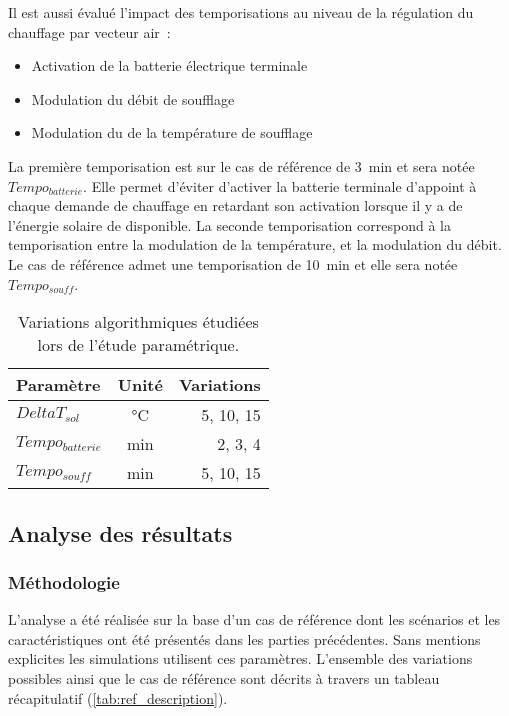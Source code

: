 Il est aussi évalué l’impact des temporisations au niveau de la régulation du chauffage
par vecteur air~:
\begin{itemize}
  \item Activation de la batterie électrique terminale
  \item Modulation du débit de soufflage
  \item Modulation du de la température de soufflage
\end{itemize}

La première temporisation est sur le cas de référence de \SI{3}{min} et sera notée
$Tempo_{batterie}$. Elle permet d’éviter d’activer la batterie terminale d’appoint à
chaque demande de chauffage en retardant son activation lorsque il y a de l’énergie
solaire de disponible. La seconde temporisation correspond à la temporisation entre la
modulation de la température, et la modulation du débit. Le cas de référence admet une
temporisation de \SI{10}{min} et elle sera notée $Tempo_{souff}$.

\begin{table}
\centering
\begin{tabular}{l c r}
    \toprule
    Paramètre            & Unité         & Variations \\
    \midrule
    $DeltaT_{sol}$   & \si{\celsius} & 5, 10, 15 \\
    $Tempo_{batterie}$   & \si{min}      & 2, 3, 4 \\
    $Tempo_{souff}$  & \si{min}      & 5, 10, 15   \\
    \bottomrule
\end{tabular}
\caption{Variations algorithmiques étudiées lors de l’étude paramétrique.
         \label{tab:variations_algo}}
\end{table}



\subsection{Analyse des résultats} %
\label{sub:analyse_des_resultats}
\subsubsection{Méthodologie} %
\label{ssub:methodologie}
L’analyse a été réalisée sur la base d’un cas de référence dont les scénarios et les
caractéristiques ont été présentés dans les parties précédentes. Sans mentions explicites les
simulations utilisent ces paramètres. L’ensemble des variations possibles ainsi que
le cas de référence sont décrits à travers un tableau récapitulatif (\autoref{tab:ref_description}).

